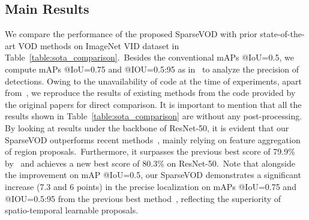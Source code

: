 \documentclass{bmvc2k}
\begin{document}
\subsection{Main Results}
\label{subsec:qantity}
We compare the performance of the proposed SparseVOD with prior state-of-the-art VOD methods on ImageNet VID dataset in Table~\ref{table:sota_comparison}.~Besides the conventional mAPs @IoU=0.5, we compute mAPs @IoU=0.75 and @IOU=0.5:95 as in~\cite{lin2014microsoft} to analyze the precision of detections. Owing to the unavailability of code at the time of experiments, apart from~\cite{he2021end, sun2021mamba}, we reproduce the results of existing methods from the code provided by the original papers for direct comparison. It is important to mention that all the results shown in Table~\ref{table:sota_comparison} are without any post-processing. By looking at results under the backbone of ResNet-50, it is evident that our SparseVOD outperforms recent methods~\cite{zhu2017flow, wu2019sequence, chen2020memory, gong2021temporal}, mainly relying on feature aggregation of region proposals.~Furthermore, it surpasses the previous best score of 79.9\% by~\cite{he2021end} and achieves a new best score of 80.3\% on ResNet-50.~Note that alongside the improvement on mAP @IoU=0.5, our SparseVOD demonstrates a significant increase (7.3 and 6 points) in the precise localization on mAPs @IoU=0.75 and @IOU=0.5:95 from the previous best method~\cite{gong2021temporal}, reflecting the superiority of spatio-temporal learnable proposals. 
\end{document}
